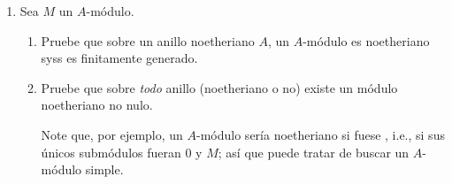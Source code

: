 \documentclass[11pt, reqno]{amsart}
\begin{document}
\begin{enumerate}
	\item Sea $M$ un $A$-módulo.
		\begin{enumerate}
			\item\label{ex:noetherian_modules}
				Pruebe que sobre un anillo noetheriano $A$, un $A$-módulo es noetheriano syss es finitamente generado.
			\item\lookup
				Pruebe que sobre \emph{todo} anillo (noetheriano o no) existe un módulo noetheriano no nulo.
				\begin{hint}
					Note que, por ejemplo, un $A$-módulo sería noetheriano si fuese ,
					i.e., si sus únicos submódulos fueran $0$ y $M$; así que puede tratar de buscar
					un $A$-módulo simple.
				\end{hint}
		\end{enumerate}
\end{enumerate}
\end{document}
